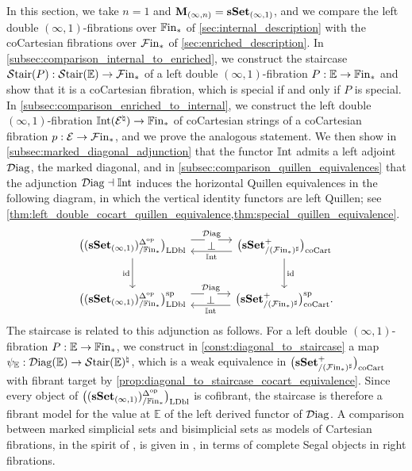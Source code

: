 \documentclass[10pt,reqno]{amsart}
\begin{document}
In this section, we take $n=1$ and $\mathbf M_{(\infty,n)}=\mathbf{sSet}_{(\infty,1)}$,
and we compare the left double $(\infty,1)$-fibrations over
$\mathbb{F}\mathrm{in}_*$ of \cref{sec:internal_description} with the coCartesian
fibrations over $\mathcal{F}\mathrm{in}_*$ of \cref{sec:enriched_description}. In
\cref{subsec:comparison_internal_to_enriched}, we construct the
staircase $\mathcal{S}\mathrm{tair}(P):\mathcal{S}\mathrm{tair}(\mathbb E)\to\mathcal{F}\mathrm{in}_*$ of a left double
$(\infty,1)$-fibration $P:\mathbb E\to\mathbb{F}\mathrm{in}_*$ and show that it
is a coCartesian fibration, which is special if and only if $P$ is
special. In \cref{subsec:comparison_enriched_to_internal}, we
construct the left double $(\infty,1)$-fibration
$\mathbb{I}\mathrm{nt}(\mathcal E^\natural)\to\mathbb{F}\mathrm{in}_*$ of coCartesian strings of a
coCartesian fibration $p:\mathcal E\to\mathcal{F}\mathrm{in}_*$, and we prove the
analogous statement. We then show in
\cref{subsec:marked_diagonal_adjunction} that the functor $\mathbb{I}\mathrm{nt}$
admits a left adjoint $\mathcal{D}\mathrm{iag}$, the marked diagonal, and in
\cref{subsec:comparison_quillen_equivalences} that the adjunction
$\mathcal{D}\mathrm{iag}\dashv\mathbb{I}\mathrm{nt}$ induces the horizontal Quillen equivalences in the
following diagram, in which the vertical identity functors are left
Quillen; see
\cref{thm:left_double_cocart_quillen_equivalence,thm:special_quillen_equivalence}.
\[
\begin{tikzcd}[ampersand replacement=\&, sep=large]
\ldblfib
 \arrow[r,shift left=1.2ex,"\Diag"]
 \arrow[r,phantom,"\bot" description]
 \arrow[d,"\id"']
\&\cocart
 \arrow[l,shift left=1.2ex,"\Int"]
 \arrow[d,"\id"]\\
\ldblfibsp
 \arrow[r,shift left=1.2ex,"\Diag"]
 \arrow[r,phantom,"\bot" description]
\&\cocartsp
 \arrow[l,shift left=1.2ex,"\Int"].
\end{tikzcd}
\]
The staircase is related to this adjunction as follows. For a left
double $(\infty,1)$-fibration $P:\mathbb E\to\mathbb{F}\mathrm{in}_*$, we
construct in \cref{const:diagonal_to_staircase} a map
$\psi_{\mathbb E}:\mathcal{D}\mathrm{iag}(\mathbb E)\to\mathcal{S}\mathrm{tair}(\mathbb E)^\natural$,
which is a weak equivalence in $\bigl(\mathbf{sSet}^+_{/(\mathcal{F}\mathrm{in}_*)^\sharp}\bigr)_{\mathrm{coCart}}$ with fibrant target by
\cref{prop:diagonal_to_staircase_cocart_equivalence}. Since every
object of $\bigl((\mathbf{sSet}_{(\infty,1)})^{\Delta^{\mathrm{op}}}_{/\mathbb{F}\mathrm{in}_*}\bigr)_{\mathrm{LDbl}}$ is cofibrant, the staircase is therefore a
fibrant model for the value at $\mathbb E$ of the left derived
functor of $\mathcal{D}\mathrm{iag}$. A comparison between marked simplicial sets and
bisimplicial sets as models of Cartesian fibrations, in the spirit of
\cite{JoyalTierney2007}, is given in
\cite[\S4.1]{Rasekh2021QuasiCategories}, in terms of complete Segal
objects in right fibrations.
\end{document}
